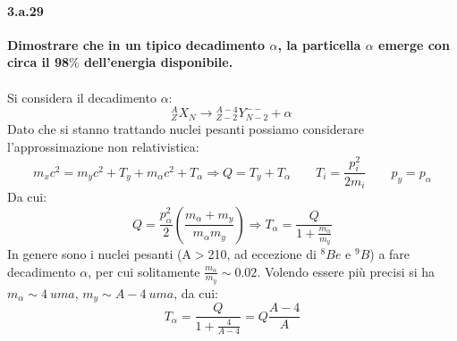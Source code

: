 \documentclass[twoside]{article}
\begin{document}
\paragraph{3.a.29}\textbf{Dimostrare che in un tipico decadimento $\alpha$, la particella $\alpha$ emerge con circa il
98$\%$ dell'energia disponibile.}\\\\
Si considera il decadimento $\alpha$:
\begin{equation}
    {}_{Z}^{A}X_N \longrightarrow {}_{Z-2}^{A-4}Y_{N-2}^{--}+ \alpha \, 
\end{equation}
Dato che si stanno trattando nuclei pesanti possiamo considerare l'approssimazione non relativistica:
\begin{equation}
    m_xc^2=m_yc^2+T_y+m_\alpha c^2+T_\alpha\Longrightarrow Q=T_y+T_\alpha \qquad T_i=\frac{p_i^2}{2m_i} \qquad p_y=p_\alpha
\end{equation}
Da cui:
\begin{equation}
    Q=\frac{p_\alpha^2}{2}\left(\frac{m_\alpha+m_y}{m_\alpha m_y}\right)\Longrightarrow T_\alpha=\frac{Q}{1+\frac{m_\alpha}{m_y}}
\end{equation}
In genere sono i nuclei pesanti (A$>$210, ad eccezione di $^8Be$ e $^9B$) a fare decadimento $\alpha$, per cui solitamente $\frac{m_\alpha}{m_y}\sim 0.02$.
Volendo essere più precisi si ha $m_\alpha\sim 4\ uma$, $m_y\sim A-4\ uma$, da cui:
\begin{equation}
     T_\alpha=\frac{Q}{1+\frac{4}{A-4}}=Q\frac{A-4}{A}
\end{equation}
\end{document}
